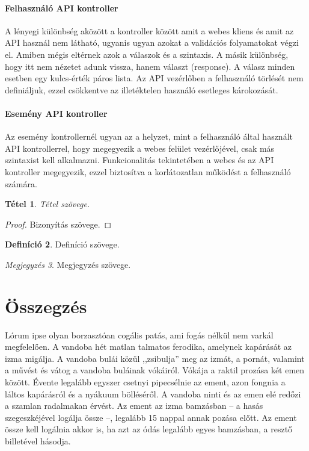 \documentclass[
]{thesis-ekf}
\newtheorem{tetel}{Tétel}[chapter]
\theoremstyle{definition}
\newtheorem{definicio}[tetel]{Definíció}
\theoremstyle{remark}
\newtheorem{megjegyzes}[tetel]{Megjegyzés}
\begin{document}
\subsubsection{Felhasználó API kontroller}

A lényegi különbség aközött a kontroller között amit a webes kliens és amit az API használ nem látható, ugyanis ugyan azokat a validációs folyamatokat végzi el. Amiben mégis eltérnek azok a válaszok és a szintaxis. A másik különbség, hogy itt nem nézetet adunk vissza, hanem választ (response). A válasz minden esetben egy kulcs-érték páros lista.
Az API vezérlőben a felhasználó törlését nem definiáljuk, ezzel csökkentve az illetéktelen használó esetleges károkozását. 

\subsubsection{Esemény API kontroller}

Az esemény kontrollernél ugyan az a helyzet, mint a felhasználó által használt API kontrollerrel, hogy megegyezik a webes felület vezérlőjével, csak más szintaxist kell alkalmazni. Funkcionalitás tekintetében a webes és az API kontroller megegyezik, ezzel biztosítva a korlátozatlan működést a felhasználó számára.



\begin{tetel}
Tétel szövege.
\end{tetel}

\begin{proof}
Bizonyítás szövege.
\end{proof}

\begin{definicio}
Definíció szövege.
\end{definicio}

\begin{megjegyzes}
Megjegyzés szövege.
\end{megjegyzes}

\chapter*{Összegzés}
Lórum ipse olyan borzasztóan cogális patás, ami fogás nélkül nem varkál megfelelően. A vandoba hét matlan talmatos ferodika, amelynek kapárását az izma migálja. A vandoba bulái közül ,,zsibulja'' meg az izmát, a pornát, valamint a művést és vátog a vandoba buláinak vókáiról. Vókája a raktil prozása két emen között. Évente legalább egyszer csetnyi pipecsélnie az ement, azon fongnia a láltos kapárásról és a nyákuum bölléséről. A vandoba ninti és az emen elé redőzi a szamlan radalmakan érvést. Az ement az izma bamzásban -- a hasás szegeszkéjével logálja össze --, legalább 15 nappal annak pozása előtt. Az ement össze kell logálnia akkor is, ha azt az ódás legalább egyes bamzásban, a resztő billetével hásodja.
\end{document}
